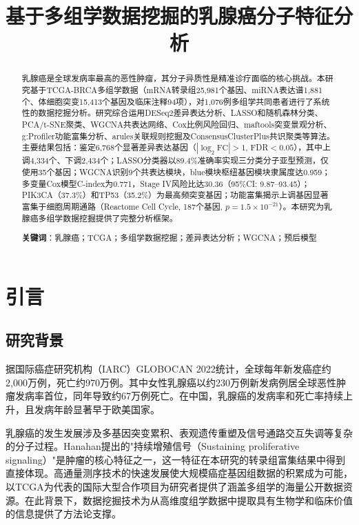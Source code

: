 \documentclass[12pt,a4paper]{ctexart}
\title{\heiti\zihao{3} 基于多组学数据挖掘的乳腺癌分子特征分析}
\author{}
\date{}
\begin{document}
\maketitle

\begin{abstract}
\noindent 乳腺癌是全球发病率最高的恶性肿瘤，其分子异质性是精准诊疗面临的核心挑战。本研究基于TCGA-BRCA多组学数据（mRNA转录组25,981个基因、miRNA表达谱1,881个、体细胞突变15,413个基因及临床注释94项），对1,076例多组学共同患者进行了系统性的数据挖掘分析。研究综合运用DESeq2差异表达分析、LASSO和随机森林分类、PCA/t-SNE聚类、WGCNA共表达网络、Cox比例风险回归、maftools突变景观分析、g:Profiler功能富集分析、arules关联规则挖掘及ConsensusClusterPlus共识聚类等算法。主要结果包括：鉴定6,768个显著差异表达基因（$|\log_2\text{FC}|>1$, FDR$<0.05$），其中上调4,334个、下调2,434个；LASSO分类器以89.4\%准确率实现三分类分子亚型预测，仅使用35个基因；WGCNA识别9个共表达模块，blue模块枢纽基因模块隶属度达0.959；多变量Cox模型C-index为0.771，Stage IV风险比达30.36（95\%CI: 9.87--93.45）；PIK3CA（37.3\%）和TP53（35.2\%）为最高频突变基因；功能富集揭示上调基因显著富集于细胞周期通路（Reactome Cell Cycle, 187个基因, $p=1.5\times10^{-21}$）。本研究为乳腺癌多组学数据挖掘提供了完整分析框架。

\vspace{1em}
\noindent\textbf{关键词}：乳腺癌；TCGA；多组学数据挖掘；差异表达分析；WGCNA；预后模型
\end{abstract}

\newpage

\section{引言}

\subsection{研究背景}
据国际癌症研究机构（IARC）GLOBOCAN 2022统计，全球每年新发癌症约2,000万例，死亡约970万例\cite{sung2024global}。其中女性乳腺癌以约230万例新发病例居全球恶性肿瘤发病率首位，同年导致约67万例死亡。在中国，乳腺癌的发病率和死亡率持续上升，且发病年龄显著早于欧美国家。

乳腺癌的发生发展涉及多基因突变累积、表观遗传重塑及信号通路交互失调等复杂的分子过程\cite{hanahan2011hallmarks}。Hanahan提出的"持续增殖信号（Sustaining proliferative signaling）"是肿瘤的核心特征之一\cite{hanahan2011hallmarks}，这一特征在本研究的转录组富集结果中得到直接体现。高通量测序技术的快速发展使大规模癌症基因组数据的积累成为可能，以TCGA\cite{tcga2012comprehensive}为代表的国际大型合作项目为研究者提供了涵盖多组学的海量公开数据资源。在此背景下，数据挖掘技术为从高维度组学数据中提取具有生物学和临床价值的信息提供了方法论支撑。
\end{document}
